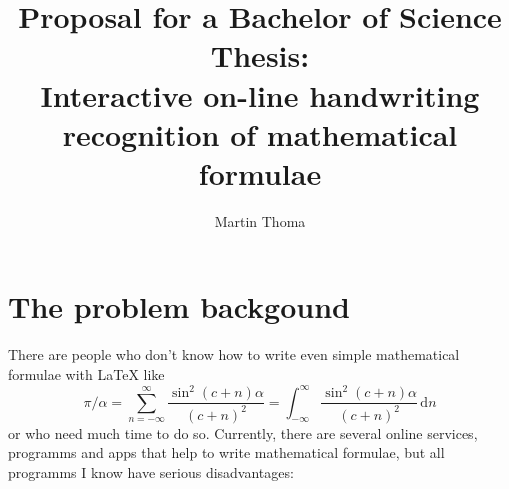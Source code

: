 \documentclass[a4paper]{scrartcl}
\begin{document}
    \title{Proposal for a Bachelor of Science Thesis:\\Interactive on-line handwriting recognition of mathematical formulae}
    \author{Martin Thoma}
    \maketitle
\section{The problem backgound}
    There are people who don't know how to write even
    simple mathematical formulae with \LaTeX{} like
    \[\pi/\alpha=\sum_{n=-\infty}^\infty \frac{\sin^2 (c+n)\alpha}{(c+n)^2}=\int_{-\infty}^\infty \frac{\sin^2 (c+n)\alpha}{(c+n)^2}\, \text{d}n\]
    or who need much time to do so. Currently, there are several online
    services, programms and apps that help to write mathematical 
    formulae, but all programms I know have serious disadvantages:
\end{document}
